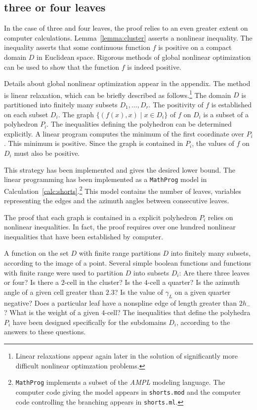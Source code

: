 \subsection{three or four leaves}\label{sec:3or4}

In the case of three and four leaves, the proof relies to an even
greater extent on computer calculations.  
Lemma~\ref{lemma:cluster} asserts a nonlinear inequality.  The inequality
asserts that some continuous function $f$ is positive on a compact
domain $D$ in Euclidean space.  Rigorous methods of global nonlinear
optimization can be used to show that the function $f$ is indeed
positive.

Details about global nonlinear optimization appear in the appendix.
The method is linear relaxation, which can be briefly described as
follows.\footnote{Linear relaxations appear again later in the
solution of significantly more difficult nonlinear optimzation
problems.}  The domain $D$ is partitioned into finitely many subsets
$D_1,\ldots, D_r$.  The positivity of $f$ is established on each
subset $D_i$.  The graph $\{(f(x), x)\mid x\in D_i\}$ of $f$ on $D_i$
is a subset of a polyhedron $P_i$.  The inequalities defining the
polyhedron can be determined explicitly.  A linear program computes
the minimum of the first coordinate over $P_i$.  This minimum is
positive.  Since the graph is contained in $P_i$, the values of $f$ on
$D_i$ must also be positive.

This strategy has been implemented and gives the desired lower bound.
The linear programming has been implemented as a {\tt MathProg} model
in Calculation~\ref{calc:shorts}.\footnote{{\tt MathProg} implements a
subset of the {\it AMPL} modeling language.  The computer code
giving the model appears in {\tt shorts.mod} and the computer code
controlling the branching appears in {\tt shorts.ml}.}  This model
contains the number of leaves, variables representing the edges and
the azimuth angles between consecutive leaves.

The proof that each graph is contained in a explicit polyhedron $P_i$
relies on nonlinear inequalities.  In fact, the proof requires over
one hundred nonlinear inequalities that have been established by
computer.

A function on the set $D$ with finite range partitions $D$ into
finitely many subsets, according to the image of a point.  Several
simple boolean functions and functions with finite range were used to
partition $D$ into subsets $D_i$: Are there three leaves or four?  Is
there a $2$-cell in the cluster?  Is the $4$-cell a quarter?  Is the
azimuth angle of a given cell greater than $2.3$?  Is the value of
$\gamma_L$ on a given quarter negative? Does a particular leaf have a
nonspline edge of length greater than $2h_-$?  What is the weight of a
given $4$-cell?  The inequalities that define the polyhedra $P_i$ have
been designed specifically for the subdomains $D_i$, according to the
answers to these questions.

